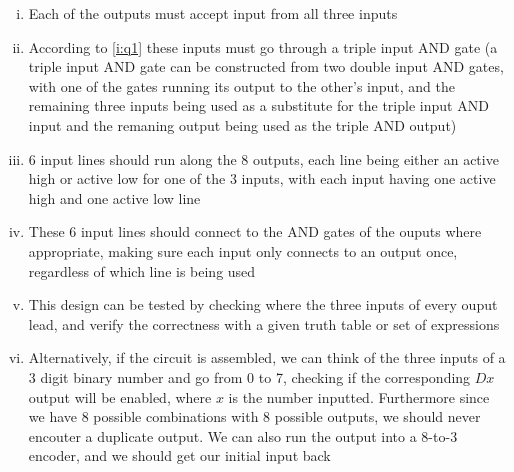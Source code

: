 \documentclass[11pt]{article} %
\begin{document}
\begin{enumerate}[(a)]
\begin{enumerate}[(i)]
	\item Each of the outputs must accept input from all three inputs
	\item According to \cref{i:q1} these inputs must go through a triple input AND gate (a triple input AND gate can be constructed from two double input AND gates, with one of the gates running its output to the other's input, and the remaining three inputs being used as a substitute for the triple input AND input and the remaning output being used as the triple AND output)
	\item 6 input lines should run along the 8 outputs, each line being either an active high or active low for one of the 3 inputs, with each input having one active high and one active low line
	\item These 6 input lines should connect to the AND gates of the ouputs where appropriate, making sure each input only connects to an output once, regardless of which line is being used
	\item This design can be tested by checking where the three inputs of every ouput lead, and verify the correctness with a given truth table or set of expressions
	\item Alternatively, if the circuit is assembled, we can think of the three inputs of a 3 digit binary number and go from 0 to 7, checking if the corresponding $Dx$ output will be enabled, where $x$ is the number inputted. Furthermore since we have 8 possible combinations with 8 possible outputs, we should never encouter a duplicate output. We can also run the output into a 8-to-3 encoder, and we should get our initial input back
\end{enumerate}
\end{enumerate}
\end{document}
